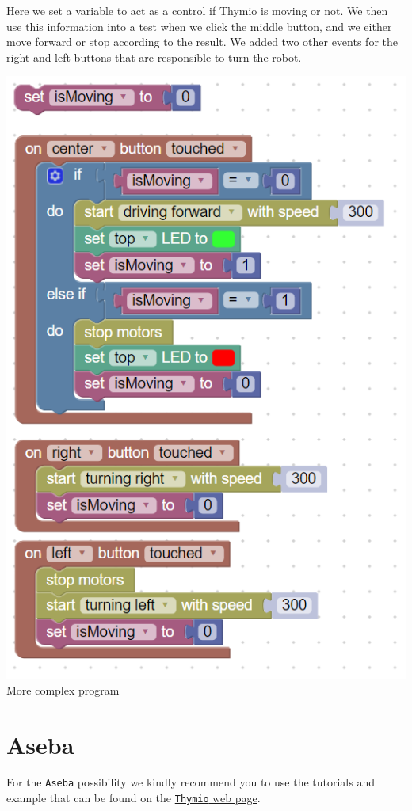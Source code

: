 \documentclass{scrbook}
\begin{document}
Here we set a variable to act as a control if Thymio is moving or not. We then use this information into a test when we click the middle button, and we either move forward or stop according to the result. 
We added two other events for the right and left buttons that are responsible to turn the robot.
\begin{center}
  \includegraphics[scale=0.5]{./Blockly/advanced_program}\\
  More complex program
\end{center}

\section{Aseba}

For the \texttt{Aseba} possibility we kindly recommend you to use the tutorials and example that can be found on the \href{https://www.thymio.org/program/aseba/}{\texttt{Thymio} web page}.
\end{document}

